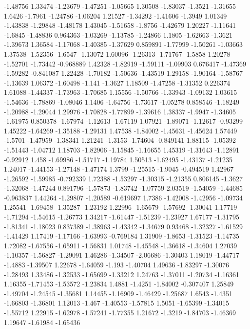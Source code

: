 \documentclass[9pt]{article}
\theoremstyle{plain}
\theoremstyle{definition}
\theoremstyle{remark}
\numberwithin{equation}{section}
\begin{document}
-1.48756
1.33474
-1.23679
-1.47251
-1.05665
1.30508
-1.83037
-1.3521
-1.31655
1.6426
-1.7961
-1.24786
-1.06204
1.21527
-1.34292
-1.41606
-1.3949
1.01349
-1.43838
-1.29848
-1.48178
1.43045
-1.51658
-1.8756
-1.42679
1.20227
-1.11641
-1.6845
-1.48836
0.964363
-1.03269
-1.13785
-1.24866
1.1805
-1.62663
-1.3621
-1.39673
1.36584
-1.17068
-1.40385
-1.37629
0.859891
-1.77999
-1.50261
-1.03663
1.37538
-1.52356
-1.6547
-1.13072
1.60096
-1.26313
-1.71767
-1.5858
1.20278
-1.52701
-1.73442
-0.968889
1.42328
-1.82919
-1.59111
-1.09903
0.676417
-1.47369
-1.59282
-0.841087
1.22428
-1.70182
-1.50636
-1.43519
1.29158
-1.90164
-1.58767
-1.13639
1.06372
-1.60498
-1.141
-1.3627
1.18509
-1.47258
-1.31352
0.226374
1.61088
-1.44337
-1.73963
-1.70685
1.15556
-1.50766
-1.33943
-1.09132
1.03615
-1.54636
-1.78869
-1.08046
1.1406
-1.64756
-1.73617
-1.05278
0.858546
-1.18249
-1.20988
-1.29044
1.29976
-1.70828
-1.77899
-1.39616
1.38337
-1.9947
-1.34605
-1.61975
0.850378
-1.67974
-1.12613
-1.67119
1.07921
-1.89071
-1.12617
-0.93299
1.45222
-1.64269
-1.35188
-1.29131
1.47538
-1.84002
-1.45631
-1.45624
1.57449
-1.5701
-1.47959
-1.38341
1.21241
-1.3153
-1.74604
-0.849141
1.88115
-1.05392
-1.51443
-1.04712
1.18703
-1.82906
-1.15845
-1.16655
1.45319
-1.31643
-1.12891
-0.92912
1.458
-1.69986
-1.51717
-1.19784
1.50513
-1.62495
-1.43137
-1.21235
1.24017
-1.44153
-1.27148
-1.47174
1.3799
-1.25515
-1.9045
-0.494519
1.42967
-1.26592
-1.59985
-0.792339
1.72388
-1.53297
-1.30315
-1.21355
0.806145
-1.3627
-1.32068
-1.47244
0.891796
-1.57873
-1.83742
-1.07759
2.03519
-1.54059
-1.44685
-0.963837
1.44264
-1.29807
-1.20589
-0.619697
1.7386
-1.42008
-1.42956
-1.09734
1.25541
-1.69458
-1.35287
-1.23192
1.22996
-1.65679
-1.57692
-1.30041
1.17719
-1.71294
-1.54615
-1.26773
1.34217
-1.61447
-1.51239
-1.23927
1.67177
-1.31795
-1.81341
-1.18023
0.837389
-1.38963
-1.43342
-1.34679
0.93468
-1.32327
-1.61529
-1.41429
1.17419
-1.17166
-1.63993
-0.769184
1.31909
-1.8653
-1.31523
-1.14735
1.72082
-1.67556
-1.65911
-1.56831
1.01748
-1.45548
-1.36618
-1.34604
1.27039
-1.10357
-1.56827
-1.29091
1.46286
-1.34507
-2.06686
-1.30403
1.18019
-1.44717
-1.4883
-1.39507
1.22678
-1.64059
-1.193
-1.40704
1.49636
-1.83297
-1.30076
-1.28493
1.33486
-1.32533
-1.65699
-1.33212
1.24763
-1.37011
-1.20734
-1.16361
1.16355
-1.71453
-1.53572
-1.23834
1.4881
-1.4251
-1.84002
-0.307407
1.25849
-1.49704
-1.24545
-1.35681
1.14455
-1.16909
-1.46429
-1.25687
1.6543
-1.4351
-1.66803
-1.36801
1.12013
-1.467
-1.40553
-1.57815
1.5051
-1.65399
-1.34015
-1.55712
1.22915
-1.62978
-1.57241
-1.77355
1.21672
-1.3219
-1.84703
-1.46369
1.19647
-1.61984
-1.65436
\end{document}
